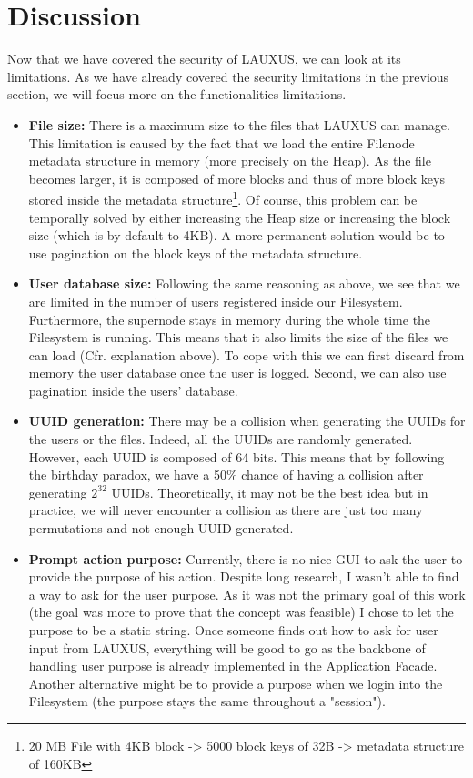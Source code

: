 \documentclass[../main.tex]{subfiles}
\begin{document}
\section{Discussion}
\label{section:analysis:limitations}
\par Now that we have covered the security of LAUXUS, we can look at its limitations. As we have already covered the security limitations in the previous section, we will focus more on the functionalities limitations.
\begin{itemize}
    \item \textbf{File size:} There is a maximum size to the files that LAUXUS can manage. This limitation is caused by the fact that we load the entire Filenode metadata structure in memory (more precisely on the Heap). As the file becomes larger, it is composed of more blocks and thus of more block keys stored inside the metadata structure\footnote{20 MB File with 4KB block -> 5000 block keys of 32B -> metadata structure of 160KB}. Of course, this problem can be temporally solved by either increasing the Heap size or increasing the block size (which is by default to 4KB). A more permanent solution would be to use pagination on the block keys of the metadata structure.
    \item \textbf{User database size:} Following the same reasoning as above, we see that we are limited in the number of users registered inside our Filesystem. Furthermore, the supernode stays in memory during the whole time the Filesystem is running. This means that it also limits the size of the files we can load (Cfr. explanation above). To cope with this we can first discard from memory the user database once the user is logged. Second, we can also use pagination inside the users' database.
    \item \textbf{UUID generation:} There may be a collision when generating the UUIDs for the users or the files. Indeed, all the UUIDs are randomly generated. However, each UUID is composed of 64 bits. This means that by following the birthday paradox, we have a 50\% chance of having a collision after generating $2^{32}$ UUIDs. Theoretically, it may not be the best idea but in practice, we will never encounter a collision as there are just too many permutations and not enough UUID generated.
    \item \textbf{Prompt action purpose:} Currently, there is no nice GUI to ask the user to provide the purpose of his action. Despite long research, I wasn't able to find a way to ask for the user purpose. As it was not the primary goal of this work (the goal was more to prove that the concept was feasible) I chose to let the purpose to be a static string. Once someone finds out how to ask for user input from LAUXUS, everything will be good to go as the backbone of handling user purpose is already implemented in the Application Facade. Another alternative might be to provide a purpose when we login into the Filesystem (the purpose stays the same throughout a "session").

\end{itemize}
\end{document}
